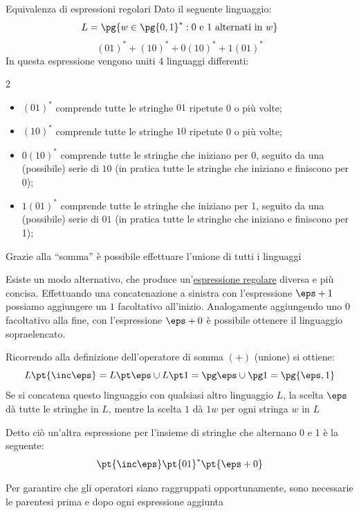 \begin{example}{Equivalenza di espressioni regolari}{}
    Dato il seguente linguaggio:
    \[
        L = \pg{w \in \pg{0,1}^*: 0 \text{ e } 1 \text{ alternati in } w}
    \]
    \[
        (01)^* + (10)^* + 0(10)^* + 1(01)^*
    \]
    In questa espressione vengono uniti 4 linguaggi differenti:
    \begin{multicols}{2}
        \begin{itemize}
            \item $(01)^*$ comprende tutte le stringhe $01$ ripetute 0 o più volte;
            \item $(10)^*$ comprende tutte le stringhe $10$ ripetute 0 o più volte;
            \item $0(10)^*$ comprende tutte le stringhe che iniziano per 0, seguito da una (possibile) serie di $10$ (in pratica tutte le stringhe che iniziano e finiscono per 0);
            \item $1(01)^*$ comprende tutte le stringhe che iniziano per 1, seguito da una (possibile) serie di $01$ (in pratica tutte le stringhe che iniziano e finiscono per 1);
        \end{itemize}
    \end{multicols}
    \begin{note}
        Grazie alla ``somma'' è possibile effettuare l'unione di tutti i linguaggi
    \end{note}
    Esiste un modo alternativo, che produce un'\hyperref[def:reg-exp]{espressione regolare} diversa e più concisa.
    Effettuando una concatenazione a sinistra con l'espressione $\eps + 1$ possiamo aggiungere un $1$ facoltativo all'inizio.
    Analogamente aggiungendo uno $0$ facoltativo alla fine, con l'espressione $\eps + 0$ è possibile ottenere il linguaggio sopraelencato.
    \begin{note}
        Ricorrendo alla definizione dell'operatore di somma $(+)$ (unione) si ottiene:
        \[
            L\pt{\inc\eps} = L\pt\eps\cup L\pt 1 = \pg\eps\cup\pg 1 = \pg{\eps,1}
        \]
        Se si concatena questo linguaggio con qualsiasi altro linguaggio $L$, la scelta $\eps$ dà tutte le stringhe in $L$, mentre la scelta $1$ dà $1w$ per ogni stringa $w$ in $L$
    \end{note}
    Detto ciò un'altra espressione per l'insieme di stringhe che alternano 0 e 1 è la seguente:
    \[
        \pt{\inc\eps}\pt{01}^*\pt{\eps + 0}
    \]
    \begin{warning}
        Per garantire che gli operatori siano raggruppati opportunamente, sono necessarie le parentesi prima e dopo ogni espressione aggiunta
    \end{warning}
\end{example}
%
